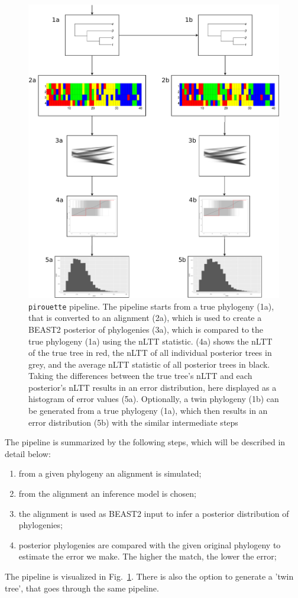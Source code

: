 \documentclass{article}
\begin{document}
\begin{figure}
  \centering
  \includegraphics[width=\textwidth]{workflow.png}
  \caption{
    \texttt{pirouette} pipeline. 
    The pipeline starts from a true phylogeny (1a), 
    that is converted to an alignment (2a), which is used
    to create a BEAST2 posterior of phylogenies (3a),
    which is compared to the true phylogeny (1a) using
    the nLTT statistic. (4a) shows the nLTT of the true tree in red,
    the nLTT of all individual posterior trees in grey, and the average
    nLTT statistic of all posterior trees in black.
    Taking the differences between the true tree's nLTT and each posterior's
    nLTT results in an error distribution, here displayed as a histogram
    of error values (5a).
    Optionally, a twin phylogeny (1b) can be generated from a true
    phylogeny (1a), which then results in an error distribution (5b) with
    the similar intermediate steps 
  }
  \label{fig:pipeline}
\end{figure}

The pipeline is summarized by the following steps, which will be described in detail below:
\begin{enumerate}
    \item from a given phylogeny an alignment is simulated;
    \item from the alignment an inference model is chosen;
    \item the alignment is used as BEAST2 input to infer a posterior distribution of phylogenies;
    \item posterior phylogenies are compared with the given original phylogeny to estimate the error we make. The higher the match, the lower the error;
\end{enumerate}
The pipeline is visualized in Fig.~\ref{fig:pipeline}.
There is also the option to generate a 'twin tree',
that goes through the same pipeline.
\end{document}
